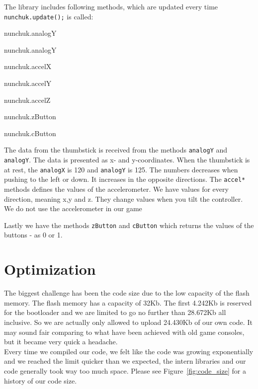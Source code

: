 The library includes following methods, which are updated every time {\tt nunchuk.update();} is called:\\



\begin{itemize}
  \begin{minipage}{0.6\linewidth}
    \item nunchuk.analogY
    \item nunchuk.analogY
    \item nunchuk.accelX
    \item nunchuk.accelY
  \end{minipage}
  \begin{minipage}{0.6\linewidth}
    \item nunchuk.accelZ
    \item nunchuk.zButton
    \item nunchuk.cButton
  \end{minipage}
\end{itemize}


The data from the thumbstick is received from the methods {\tt analogY} and {\tt analogY}.
The data is presented as x- and
y-coordinates. When the thumbstick is at rest, the {\tt analogX} is 120 and
{\tt analogY} is 125.  The numbers decreases when pushing to the left or down.
It increases in the opposite directions. The {\tt accel*} methods defines the values of
the accelerometer. We have values for every direction, meaning x,y and z. They change values
when you tilt the controller. We do not use the accelerometer in our game 

Lastly we have the methods {\tt zButton} and {\tt cButton} which
returns the values of the buttons - as 0 or 1.


\section{Optimization}%
The biggest challenge has been the code size due to the low capacity of the flash memory.  The flash memory has a capacity of 32Kb. The first 4.242Kb is reserved for the bootloader and we are limited to go no further than 28.672Kb all inclusive. So we are actually only allowed to upload 24.430Kb of our own code. It may sound fair comparing to what have been achieved with old game consoles, but it became very quick a headache.\\
Every time we compiled our code, we felt like the code was growing exponentially and we reached the limit quicker than we expected, the intern libraries and our code generally took way too much space. Please see Figure~\ref{fig:code_size} for a history of our code size.

